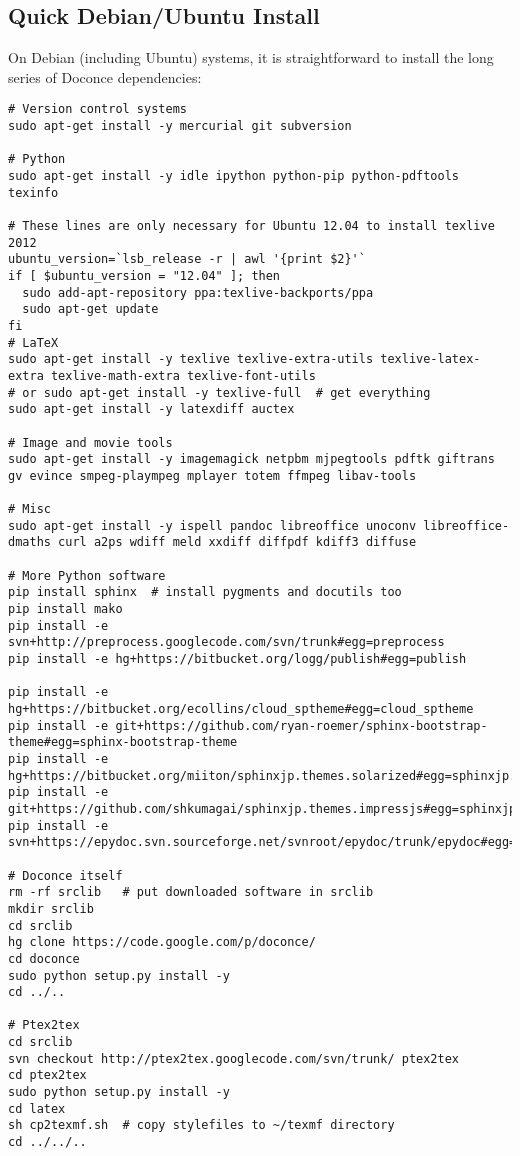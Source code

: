\documentclass[%
oneside,                 %
final,                   %
10pt]{article}
\begin{document}
\noindent
\subsection{Quick Debian/Ubuntu Install}

On Debian (including Ubuntu) systems, it is straightforward to install the
long series of Doconce dependencies:

\begin{Verbatim}[fontsize=\fontsize{9pt}{9pt},tabsize=8,baselinestretch=0.85,fontfamily=tt,xleftmargin=7mm]
# Version control systems
sudo apt-get install -y mercurial git subversion

# Python
sudo apt-get install -y idle ipython python-pip python-pdftools texinfo

# These lines are only necessary for Ubuntu 12.04 to install texlive 2012
ubuntu_version=`lsb_release -r | awl '{print $2}'`
if [ $ubuntu_version = "12.04" ]; then
  sudo add-apt-repository ppa:texlive-backports/ppa
  sudo apt-get update
fi
# LaTeX
sudo apt-get install -y texlive texlive-extra-utils texlive-latex-extra texlive-math-extra texlive-font-utils
# or sudo apt-get install -y texlive-full  # get everything
sudo apt-get install -y latexdiff auctex

# Image and movie tools
sudo apt-get install -y imagemagick netpbm mjpegtools pdftk giftrans gv evince smpeg-plaympeg mplayer totem ffmpeg libav-tools

# Misc
sudo apt-get install -y ispell pandoc libreoffice unoconv libreoffice-dmaths curl a2ps wdiff meld xxdiff diffpdf kdiff3 diffuse

# More Python software
pip install sphinx  # install pygments and docutils too
pip install mako
pip install -e svn+http://preprocess.googlecode.com/svn/trunk#egg=preprocess
pip install -e hg+https://bitbucket.org/logg/publish#egg=publish

pip install -e hg+https://bitbucket.org/ecollins/cloud_sptheme#egg=cloud_sptheme
pip install -e git+https://github.com/ryan-roemer/sphinx-bootstrap-theme#egg=sphinx-bootstrap-theme
pip install -e hg+https://bitbucket.org/miiton/sphinxjp.themes.solarized#egg=sphinxjp.themes.solarized
pip install -e git+https://github.com/shkumagai/sphinxjp.themes.impressjs#egg=sphinxjp.themes.impressjs
pip install -e svn+https://epydoc.svn.sourceforge.net/svnroot/epydoc/trunk/epydoc#egg=epydoc

# Doconce itself
rm -rf srclib   # put downloaded software in srclib
mkdir srclib
cd srclib
hg clone https://code.google.com/p/doconce/
cd doconce
sudo python setup.py install -y
cd ../..

# Ptex2tex
cd srclib
svn checkout http://ptex2tex.googlecode.com/svn/trunk/ ptex2tex
cd ptex2tex
sudo python setup.py install -y
cd latex
sh cp2texmf.sh  # copy stylefiles to ~/texmf directory
cd ../../..
\end{Verbatim}
\noindent



\printindex
\end{document}
